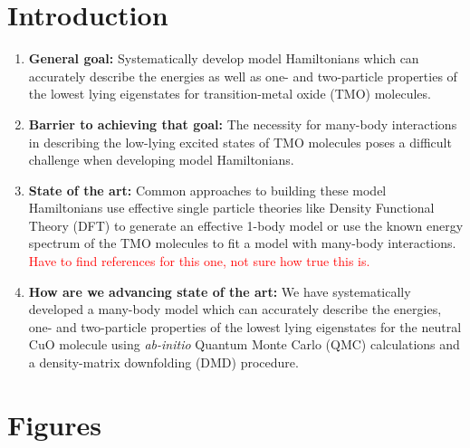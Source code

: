\documentclass{article}
\begin{document}
\section{Introduction}
\begin{enumerate}
\item \textbf{General goal: }
Systematically develop model Hamiltonians which can accurately describe the energies as well as one- and two-particle properties of the lowest lying eigenstates for transition-metal oxide (TMO) molecules.

\item \textbf{Barrier to achieving that goal: } The necessity for many-body interactions in describing the low-lying excited states of TMO molecules poses a difficult challenge when developing model Hamiltonians.

\item \textbf{State of the art: } Common approaches to building these model Hamiltonians use effective single particle theories like Density Functional Theory (DFT) to generate an effective 1-body model or use the known energy spectrum of the TMO molecules to fit a model with many-body interactions. 
\textcolor{red}{Have to find references for this one, not sure how true this is.}

\item\textbf{How are we advancing state of the art: } We have systematically developed a many-body model which can accurately describe the energies, one- and two-particle properties of the lowest lying eigenstates for the neutral CuO molecule using \textit{ab-initio} Quantum Monte Carlo (QMC) calculations and a density-matrix downfolding (DMD) procedure. 
\end{enumerate}

\section{Figures}
\end{document}
